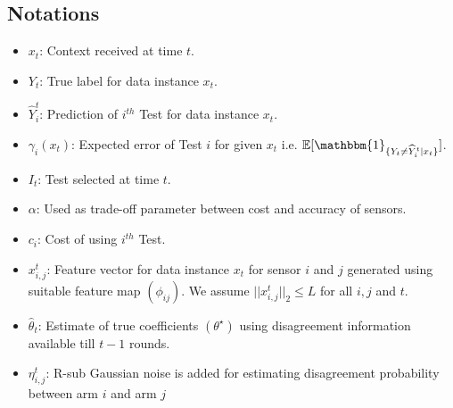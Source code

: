 \subsection{Notations}
\label{sec:dma_not}
\begin{itemize}
	\item $x_t$: Context received at time $t$.
	\item $Y_t$: True label for data instance $x_t$.
	\item $\widehat{Y}_i^t$: Prediction of $i^{th}$ Test for data instance $x_t$.
	\item $\gamma_i(x_t)$: Expected error of Test $i$ for given $x_t$ i.e. $\mathbb{E}[\mathbbm{1}_{\{Y_t \neq \widehat{Y}_i^t| x_t\}}]$.
	\item $I_t$: Test selected at time $t$.
	\item $\alpha$: Used as trade-off parameter between cost and accuracy of sensors.
	\item $c_i$: Cost of using $i^{th}$ Test.
	\item $x_{i,j}^t$: Feature vector for data instance $x_t$ for sensor $i$ and $j$ generated using suitable feature map $(\phi_{ij})$. We assume $||x_{i,j}^t||_2 \le L$ for all $i,j$ and $t$.
	\item $\widehat{\theta}_t$: Estimate of true coefficients $(\theta^\star)$ using disagreement information available till $t-1$ rounds.
	\item $\eta_{i,j}^t$: R-sub Gaussian noise is added for estimating disagreement probability between arm $i$ and arm $j$ 
\end{itemize}

